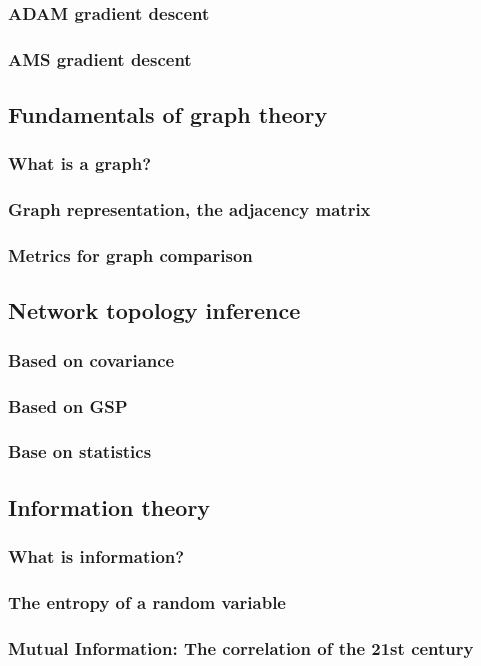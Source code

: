 \documentclass{article}
\begin{document}
\subsubsection{ADAM gradient descent}
\subsubsection{AMS gradient descent}
\subsection{Fundamentals of graph theory}
\subsubsection{What is a graph?}
\subsubsection{Graph representation, the adjacency matrix}
\subsubsection{Metrics for graph comparison}
\subsection{Network topology inference}
\subsubsection{Based on covariance}
\subsubsection{Based on GSP}
\subsubsection{Base on statistics}
\subsection{Information theory}
\subsubsection{What is information?}
\subsubsection{The entropy of a random variable}
\subsubsection{Mutual Information: The correlation of the 21st century }
\end{document}
